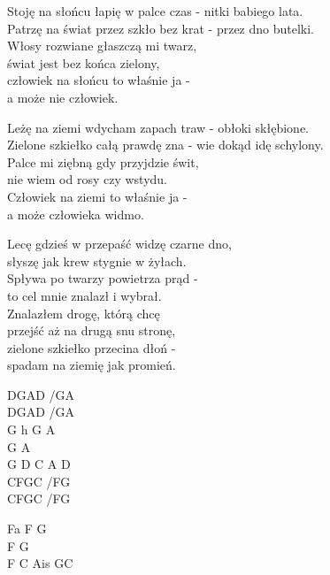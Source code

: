 \begin{text}
    \small{
    Stoję na słońcu łapię w palce czas - nitki babiego lata.\\
    Patrzę na świat przez szkło bez krat - przez dno butelki.\\
    Włosy rozwiane głaszczą mi twarz,\\
    świat jest bez końca zielony,\\
    człowiek na słońcu to właśnie ja -\\
    a może nie człowiek.

    Leżę na ziemi wdycham zapach traw - obłoki skłębione.\\
    Zielone szkiełko całą prawdę zna - wie dokąd idę schylony.\\
    Palce mi ziębną gdy przyjdzie świt,\\
    nie wiem od rosy czy wstydu.\\
    Człowiek na ziemi to właśnie ja -\\
    a może człowieka widmo.

    Lecę gdzieś w przepaść widzę czarne dno,\\
    słyszę jak krew stygnie w żyłach.\\
    Spływa po twarzy powietrza prąd -\\
    to cel mnie znalazł i wybrał.\\
    Znalazłem drogę, którą chcę\\
    przejść aż na drugą snu stronę,\\
    zielone szkiełko przecina dłoń -\\
    spadam na ziemię jak promień.
    }
\end{text}
\begin{chord}
    \small{
    DGAD /GA\\
    DGAD /GA\\
    G h G A\\
    G A\\
    G D C A D\\
    CFGC /FG\\
    CFGC /FG

    \hfill\break
    \hfill\break
    \hfill\break
    \hfill\break
    \hfill\break
    \hfill\break
    \hfill\break
    \hfill\break
    \hfill\break
    \hfill\break
    \hfill\break
    \hfill\break
    \hfill\break
    Fa F G\\
    F G\\
    F C Ais GC
    }
\end{chord}